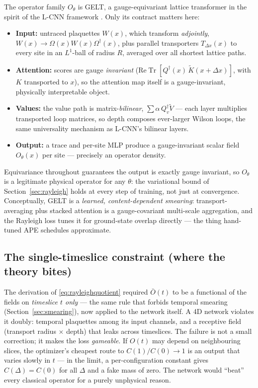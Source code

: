 \documentclass[11pt,a4paper]{article}
\newcommand{\Tr}{\operatorname{Tr}}
\newcommand{\Obar}{\bar{O}}
\begin{document}
The operator family $O_\theta$ is GELT, a gauge-equivariant lattice
transformer in the spirit of the L-CNN framework \cite{Favoni2020}. Only its
contract matters here:
\begin{itemize}
  \item \textbf{Input:} untraced plaquettes $W(x)$, which transform
  \emph{adjointly}, $W(x)\to\Omega(x)W(x)\Omega^\dagger(x)$, plus parallel
  transporters $T_{\Delta x}(x)$ to every site in an $L^1$-ball of radius $R$,
  averaged over all shortest lattice paths.
  \item \textbf{Attention:} scores are gauge \emph{invariant}
  ($\mathrm{Re}\Tr[Q^\dagger(x)\,\tilde K(x{+}\Delta x)]$, with $K$
  transported to $x$), so the attention map itself is a gauge-invariant,
  physically interpretable object.
  \item \textbf{Values:} the value path is matrix-\emph{bilinear},
  $\sum \alpha\, Q_v^\dagger \tilde V$ --- each layer multiplies transported
  loop matrices, so depth composes ever-larger Wilson loops, the same
  universality mechanism as L-CNN's bilinear layers.
  \item \textbf{Output:} a trace and per-site MLP produce a gauge-invariant
  scalar field $O_\theta(x)$ per site --- precisely an operator density.
\end{itemize}
Equivariance throughout guarantees the output is exactly gauge invariant, so
$O_\theta$ is a legitimate physical operator for any $\theta$: the
variational bound of Section~\ref{sec:rayleigh} holds at every step of
training, not just at convergence. Conceptually, GELT is a \emph{learned,
content-dependent smearing}: transport-averaging plus stacked attention is a
gauge-covariant multi-scale aggregation, and the Rayleigh loss tunes it for
ground-state overlap directly --- the thing hand-tuned APE schedules
approximate.

\subsection{The single-timeslice constraint (where the theory bites)}
\label{sec:constraint}

The derivation of \eqref{eq:rayleighquotient} required $\Obar(t)$ to be a
functional of the fields on \emph{timeslice $t$ only} --- the same rule that
forbids temporal smearing (Section~\ref{sec:smearing}), now applied to the
network itself. A 4D network violates it doubly: temporal plaquettes among
its input channels, and a receptive field (transport radius $\times$ depth)
that leaks across timeslices. The failure is not a small correction; it makes
the loss \emph{gameable}. If $O(t)$ may depend on neighbouring slices, the
optimizer's cheapest route to $C(1)/C(0)\to1$ is an output that varies slowly
in $t$ --- in the limit, a per-configuration constant gives
$C(\Delta)=C(0)$ for all $\Delta$ and a fake mass of zero. The network would
``beat'' every classical operator for a purely unphysical reason.
\end{document}
